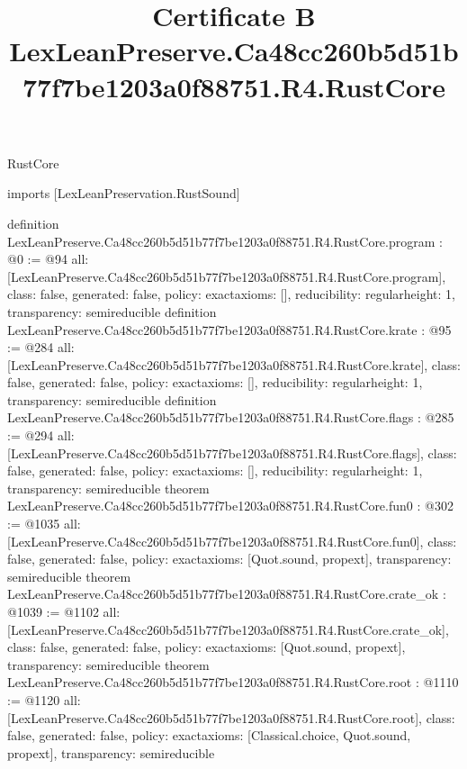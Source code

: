 \begin{lexlean}{RustCore}
\title{Certificate B LexLeanPreserve.Ca48cc260b5d51b77f7be1203a0f88751.R4.RustCore}
\begin{coremodule}
imports [LexLeanPreservation.RustSound]

definition LexLeanPreserve.Ca48cc260b5d51b77f7be1203a0f88751.R4.RustCore.program : @0 := @94 {
  all: [LexLeanPreserve.Ca48cc260b5d51b77f7be1203a0f88751.R4.RustCore.program],
  class: false,
  generated: false,
  policy: exact{axioms: []},
  reducibility: regular{height: 1},
  transparency: semireducible
}
definition LexLeanPreserve.Ca48cc260b5d51b77f7be1203a0f88751.R4.RustCore.krate : @95 := @284 {
  all: [LexLeanPreserve.Ca48cc260b5d51b77f7be1203a0f88751.R4.RustCore.krate],
  class: false,
  generated: false,
  policy: exact{axioms: []},
  reducibility: regular{height: 1},
  transparency: semireducible
}
definition LexLeanPreserve.Ca48cc260b5d51b77f7be1203a0f88751.R4.RustCore.flags : @285 := @294 {
  all: [LexLeanPreserve.Ca48cc260b5d51b77f7be1203a0f88751.R4.RustCore.flags],
  class: false,
  generated: false,
  policy: exact{axioms: []},
  reducibility: regular{height: 1},
  transparency: semireducible
}
theorem LexLeanPreserve.Ca48cc260b5d51b77f7be1203a0f88751.R4.RustCore.fun0 : @302 := @1035 {
  all: [LexLeanPreserve.Ca48cc260b5d51b77f7be1203a0f88751.R4.RustCore.fun0],
  class: false,
  generated: false,
  policy: exact{axioms: [Quot.sound, propext]},
  transparency: semireducible
}
theorem LexLeanPreserve.Ca48cc260b5d51b77f7be1203a0f88751.R4.RustCore.crate_ok : @1039 := @1102 {
  all: [LexLeanPreserve.Ca48cc260b5d51b77f7be1203a0f88751.R4.RustCore.crate_ok],
  class: false,
  generated: false,
  policy: exact{axioms: [Quot.sound, propext]},
  transparency: semireducible
}
theorem LexLeanPreserve.Ca48cc260b5d51b77f7be1203a0f88751.R4.RustCore.root : @1110 := @1120 {
  all: [LexLeanPreserve.Ca48cc260b5d51b77f7be1203a0f88751.R4.RustCore.root],
  class: false,
  generated: false,
  policy: exact{axioms: [Classical.choice, Quot.sound, propext]},
  transparency: semireducible
}


\end{coremodule}
\end{lexlean}
